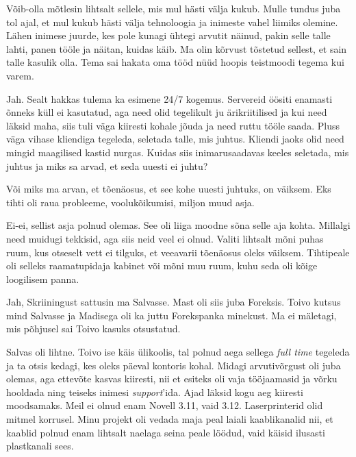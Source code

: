 Võib-olla mõtlesin lihtsalt sellele, mis mul hästi välja kukub. Mulle tundus juba tol ajal, et mul kukub hästi välja tehnoloogia ja inimeste vahel liimiks 
olemine. Lähen inimese juurde, kes pole kunagi ühtegi arvutit 
näinud, pakin selle talle lahti, panen tööle ja näitan, kuidas käib. Ma 
olin kõrvust tõstetud sellest, et sain talle kasulik olla. Tema sai hakata oma tööd 
nüüd hoopis teistmoodi tegema kui varem. 


Jah. Sealt hakkas tulema ka esimene 24/7 kogemus. Servereid
öösiti enamasti õnneks küll ei kasutatud, aga need olid tegelikult ju 
ärikriitilised ja kui need läksid maha, siis tuli väga kiiresti kohale jõuda ja 
need ruttu tööle saada. Pluss väga vihase kliendiga tegeleda, 
seletada talle, mis juhtus. Kliendi jaoks olid need mingid maagilised kastid 
nurgas. Kuidas siis inimarusaadavas keeles seletada, mis juhtus ja miks sa 
arvad, et seda uuesti ei juhtu?


Või miks ma arvan, et tõenäosus, et see kohe uuesti juhtuks, on 
väiksem. Eks tihti oli raua probleeme, voolukõikumisi, miljon muud 
asja. 


Ei-ei, sellist asja polnud olemas. See oli liiga moodne sõna selle aja kohta. 
Millalgi need muidugi tekkisid, aga siis neid veel ei olnud. Valiti lihtsalt mõni 
puhas ruum, kus otseselt vett ei tilguks, et veeavarii tõenäosus 
oleks väiksem. Tihtipeale oli selleks raamatupidaja kabinet või mõni muu ruum, kuhu seda oli kõige 
loogilisem panna. 


Jah, Skriiningust sattusin ma Salvasse. Mast oli siis juba 
Foreksis. Toivo kutsus mind Salvasse ja Madisega oli ka juttu 
Forekspanka minekust. Ma ei mäletagi, mis põhjusel sai 
Toivo kasuks otsustatud. 

Salvas oli lihtne. Toivo ise käis ülikoolis, tal 
polnud aega sellega \emph{full time} tegeleda ja ta otsis kedagi, kes oleks 
päeval kontoris kohal. Midagi arvutivõrgust oli juba olemas, aga 
ettevõte kasvas kiiresti, nii et esiteks oli vaja tööjaamasid ja võrku 
hooldada ning teiseks inimesi \emph{support}'ida. Ajad läksid kogu aeg kiiresti moodsamaks. Meil ei olnud enam 
Novell 3.11, vaid 3.12. Laserprinterid olid mitmel korrusel. Minu projekt oli vedada maja peal laiali kaablikanalid nii, et kaablid 
polnud enam lihtsalt naelaga seina peale löödud, vaid käisid ilusasti 
plastkanali sees. 

